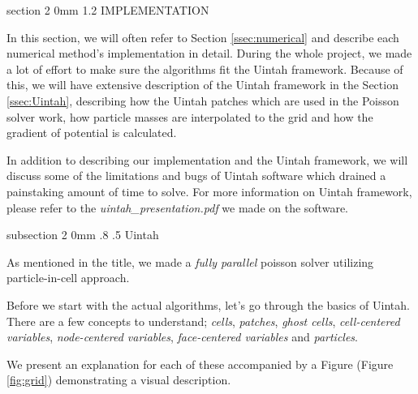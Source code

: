 \documentclass[notitlepage, 12pt]{article}
\makeatletter
\renewcommand{\section}{\@startsection       %
        {section}
        {2}
        {0mm}
        {1.2\baselineskip}
        {\baselineskip}
        {\centering\normalsize}}
\renewcommand{\subsection}{\@startsection    %
        {subsection}
        {2}
        {0mm}
        {.8\baselineskip}
        {.5\baselineskip}
        {\bfseries\normalsize}}
\makeatother
\begin{document}
\section{IMPLEMENTATION}

In this section, we will often refer to Section \ref{ssec:numerical} and describe each numerical method's implementation in detail. During the whole 
project, we made a lot of effort to make sure the algorithms fit the Uintah framework. Because of this, we will have extensive description of 
the Uintah framework in the Section \ref{ssec:Uintah}, describing how the Uintah patches which are used in the Poisson solver work, 
how particle masses are interpolated to the grid and how the gradient of potential is calculated. 

In addition to describing our implementation and the Uintah framework, 
we will discuss some of the limitations and 
bugs of Uintah software which drained a painstaking amount of time to solve. For more information on Uintah framework, please refer to the \emph{uintah\_presentation.pdf} 
we made on the software.

\subsection{Uintah} \label{ssec:Uintah}

As mentioned in the title, we made a \emph{fully parallel} poisson solver utilizing particle-in-cell approach.

Before we start with the actual algorithms, let's go through the basics of Uintah. There are a few concepts to understand; \emph{cells}, \emph{patches}, 
\emph{ghost cells}, \emph{cell-centered variables}, \emph{node-centered variables}, \emph{face-centered variables} and \emph{particles}. 

We present an explanation for each of these accompanied by a Figure (Figure \ref{fig:grid}) demonstrating a visual description.
\end{document}

